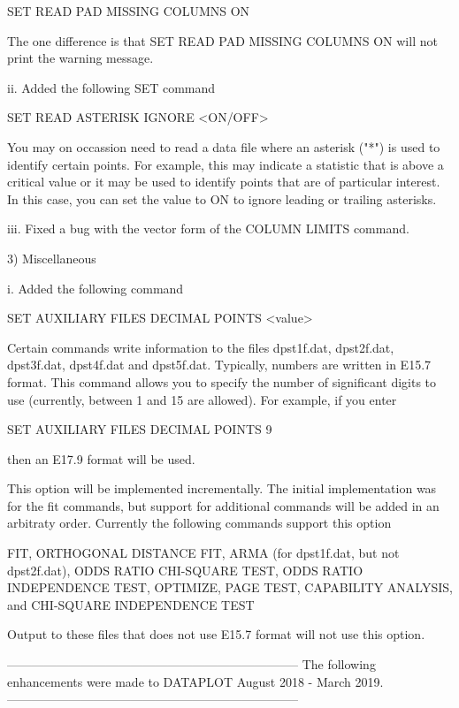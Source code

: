               SET READ PAD MISSING COLUMNS ON

         The one difference is that SET READ PAD MISSING COLUMNS ON will
         not print the warning message.

     ii. Added the following SET command

            SET READ ASTERISK IGNORE <ON/OFF>

         You may on occassion need to read a data file where an asterisk
         ("*") is used to identify certain points.  For example, this may
         indicate a statistic that is above a critical value or it may
         be used to identify points that are of particular interest.  In
         this case, you can set the value to ON to ignore leading or
         trailing asterisks.

    iii. Fixed a bug with the vector form of the COLUMN LIMITS command.

 3) Miscellaneous

      i. Added the following command

           SET AUXILIARY FILES DECIMAL POINTS <value>

         Certain commands write information to the files dpst1f.dat,
         dpst2f.dat, dpst3f.dat, dpst4f.dat and dpst5f.dat.  Typically,
         numbers are written in E15.7 format.  This command allows you to
         specify the number of significant digits to use (currently,
         between 1 and 15 are allowed).  For example, if you enter

           SET AUXILIARY FILES DECIMAL POINTS 9

         then an E17.9 format will be used.

         This option will be implemented incrementally.  The initial
         implementation was for the fit commands, but support for
         additional commands will be added in an arbitraty order.
         Currently the following commands support this option

           FIT, ORTHOGONAL DISTANCE FIT, ARMA (for dpst1f.dat, but not
           dpst2f.dat), ODDS RATIO CHI-SQUARE TEST, ODDS RATIO
           INDEPENDENCE TEST, OPTIMIZE, PAGE TEST, CAPABILITY ANALYSIS,
           and CHI-SQUARE INDEPENDENCE TEST

         Output to these files that does not use E15.7 format will not
         use this option.

-----------------------------------------------------------------------
The following enhancements were made to DATAPLOT
August 2018 - March 2019.
-----------------------------------------------------------------------

